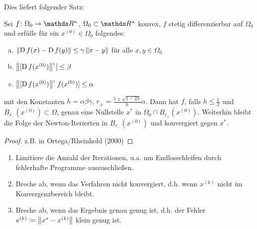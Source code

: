 Dies liefert folgender Satz:
\begin{satz}
  Sei $f\colon\Omega_0\to \Ren$, $\Omega_0 \subset \Ren$ konvex,
  $f$ stetig differenzierbar auf $\Omega_0$ und 
  erfülle für ein $x^{(0)}\in \Omega_0$ folgendes:
  \begin{enumerate}[a)]
  \item $\nn[\D f(x) -\D f(y)]\leq \gamma \nn[x-y]$ für alle $x,y\in \Omega_0$
  \item $\nn[[\D f(x^{(0)})]^{_1}] \leq \beta$
  \item $\nn[[\D f(x^{(0)})]^{_1}f(x^{(0)})] \leq \alpha$
  \end{enumerate}
  mit den Konstanten $h=\alpha\beta\gamma$, 
  $r_\pm = \frac{1\pm \sqrt{1-2h}}{h}\alpha$.
  Dann hat $f$, falls $h\leq \frac{1}{2}$ 
  und $\overline{B_{r_{-}}(x^{(0)})}\subset \Omega$,
  genau eine Nullstelle $x^{*}$ in $\Omega_0\cap B_{r_+}(x^{(0)})$.
  Weiterhin bleibt die Folge der Newton-Iterierten in $B_{r_{-}}(x^{(0)})$
  und konvergiert gegen $x^{*}$.
  \begin{proof}
    z.B. in Ortega/Rheinhold (2000)
  \end{proof}
\end{satz}

\begin{enumerate}[1)]
\item Limitiere die Anzahl der Iterationen, u.a. um 
  Endlosschleifen durch fehlerhafte Programme auszuschließen.
\item Breche ab, wenn das Verfahren nicht konvergiert, d.h.
  wenn $x^{(k)}$ nicht im Konvergenzbereich bleibt.
\item Breche ab, wenn das Ergebnis genau genug ist, d.h. der
  Fehler $e^{(k)}\coloneqq \nn[x^{*}-x^{(k)}]$ klein genug ist.
\end{enumerate}


